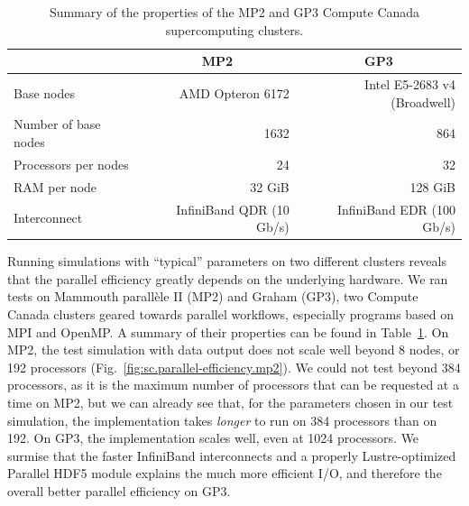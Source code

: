\documentclass[11pt,SymmetricalJury]{inrsthesis/inrsthesis}
\begin{document}
\begin{table}
  \begin{tabular}{lrr}
  \toprule
                       & \multicolumn{1}{c}{MP2}   & \multicolumn{1}{c}{GP3}      \\
  \midrule
  Base nodes           & AMD Opteron 6172          & Intel E5-2683 v4 (Broadwell) \\
  Number of base nodes & 1632                      & 864                          \\
  Processors per nodes & 24                        & 32                           \\
  RAM per node         & 32 GiB                    & 128 GiB                      \\
  Interconnect         & InfiniBand QDR (10 Gb/s)  & InfiniBand EDR (100 Gb/s)    \\
  \bottomrule
  \end{tabular}
  \caption{Summary of the properties of the MP2 and GP3 Compute Canada supercomputing clusters.}
  \label{tab:sc.summary-of-cc-clusters}
\end{table}


Running simulations with ``typical'' parameters on two different clusters
reveals that the parallel efficiency greatly depends on the underlying hardware.
We ran tests on Mammouth parallèle II (MP2) and Graham (GP3), two Compute Canada
clusters geared towards parallel workflows, especially programs based on MPI and
OpenMP. A summary of their properties can be found in
Table~\ref{tab:sc.summary-of-cc-clusters}. On MP2, the test simulation with data
output does not scale well beyond 8 nodes, or 192 processors
(Fig.~\ref{fig:sc.parallel-efficiency.mp2}). We could not test beyond 384
processors, as it is the maximum number of processors that can be requested at a
time on MP2, but we can already see that, for the parameters chosen in our test
simulation, the implementation takes \textit{longer} to run on 384 processors
than on 192. On GP3, the implementation scales well, even at 1024 processors. We
surmise that the faster InfiniBand interconnects and a properly Lustre-optimized
Parallel HDF5 module explains the much more efficient I/O, and therefore the
overall better parallel efficiency on GP3.
\end{document}
